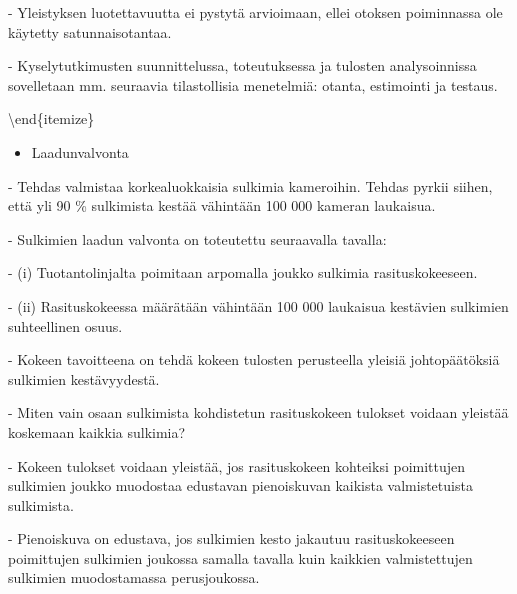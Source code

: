 \documentclass[
]{book}
\providecommand{\tightlist}{%
  \setlength{\itemsep}{0pt}\setlength{\parskip}{0pt}}
\begin{document}
\begin{itemize}
\begin{itemize}
\begin{itemize}
\begin{itemize}
- Yleistyksen luotettavuutta ei pystytä arvioimaan, ellei otoksen poiminnassa ole käytetty satunnaisotantaa.

- Kyselytutkimusten suunnittelussa, toteutuksessa ja tulosten analysoinnissa sovelletaan mm. seuraavia tilastollisia menetelmiä: otanta, estimointi ja testaus.

\end{itemize}

\textbackslash end\{itemize\}

\vspace{0.75cm}

\vspace{0.75cm}

\begin{itemize}
\tightlist
\item
  Laadunvalvonta
\end{itemize}

\begin{itemize}

- Tehdas valmistaa korkealuokkaisia sulkimia kameroihin. Tehdas pyrkii siihen, että yli 90 \% sulkimista kestää vähintään 100 000 kameran laukaisua. 

- Sulkimien laadun valvonta on toteutettu seuraavalla tavalla:

\begin{itemize}

- (i) Tuotantolinjalta poimitaan arpomalla joukko sulkimia rasituskokeeseen.

- (ii) Rasituskokeessa määrätään vähintään 100 000 laukaisua kestävien sulkimien
suhteellinen osuus.

\end{itemize}

- Kokeen tavoitteena on tehdä kokeen tulosten perusteella yleisiä johtopäätöksiä sulkimien kestävyydestä.

- Miten vain osaan sulkimista kohdistetun rasituskokeen tulokset voidaan yleistää koskemaan kaikkia sulkimia?

\begin{itemize}

- Kokeen tulokset voidaan yleistää, jos rasituskokeen kohteiksi poimittujen sulkimien joukko muodostaa edustavan pienoiskuvan kaikista valmistetuista sulkimista.

- Pienoiskuva on edustava, jos sulkimien kesto jakautuu rasituskokeeseen poimittujen sulkimien joukossa samalla tavalla kuin kaikkien valmistettujen sulkimien muodostamassa perusjoukossa.


\end{itemize}
\end{itemize}
\end{itemize}
\end{itemize}
\end{itemize}
\end{document}
